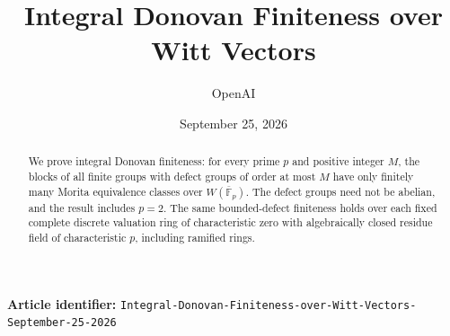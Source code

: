 \documentclass[11pt]{article}
\title{Integral Donovan Finiteness over Witt Vectors}
\author{OpenAI}
\date{September 25, 2026}
\begin{document}
\maketitle
\begin{abstract}
We prove integral Donovan finiteness: for every prime $p$ and positive
integer $M$, the blocks of all finite groups with defect groups of order
at most $M$ have only finitely many Morita equivalence classes over
$W(\overline{\mathbb F}_p)$. The defect groups need not be abelian,
and the result includes $p=2$. The same bounded-defect finiteness holds
over each fixed complete discrete valuation ring of characteristic zero
with algebraically closed residue field of characteristic $p$,
including ramified rings.
\end{abstract}
\noindent\small\textbf{Article identifier:}
\nolinkurl{Integral-Donovan-Finiteness-over-Witt-Vectors-September-25-2026}
\normalsize
\tableofcontents









\end{document}
